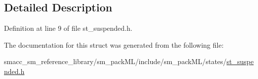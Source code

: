 \subsection{Detailed Description}


Definition at line 9 of file st\+\_\+suspended.\+h.



The documentation for this struct was generated from the following file\+:\begin{DoxyCompactItemize}
\item 
smacc\+\_\+sm\+\_\+reference\+\_\+library/sm\+\_\+pack\+M\+L/include/sm\+\_\+pack\+M\+L/states/\hyperlink{sm__packML_2include_2sm__packML_2states_2st__suspended_8h}{st\+\_\+suspended.\+h}\end{DoxyCompactItemize}
